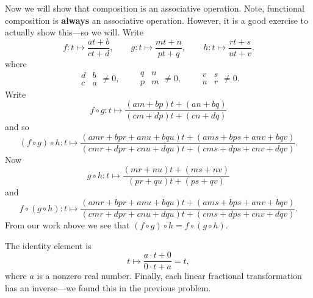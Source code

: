 \documentclass{ximera}
\begin{document}
\begin{exercise}
\begin{solution}
{Now we will show that composition is an associative operation. Note,
functional composition is \textbf{always} an associative
operation. However, it is a good exercise to actually show this---so
we will. Write
\[
f:t \mapsto\frac{at+b}{ct+d},\qquad
g:t \mapsto\frac{mt+n}{pt+q},\qquad
h:t \mapsto\frac{rt+s}{ut+v}.
\]
where
\[
\begin{array}{|cc|}
d & b\\
c& a
\end{array} \ne 0,\qquad
\begin{array}{|cc|}
q & n\\
p& m
\end{array} \ne 0,\qquad
\begin{array}{|cc|}
v & s\\
u& r
\end{array} \ne 0.
\]
Write
\[
f\circ g : t \mapsto \frac{(am+bp)t+(an+bq)}{(cm+dp)t + (cn+dq)}
\]
and so
\[
(f\circ g) \circ h : t\mapsto \frac{(amr+bpr+anu+bqu)t+(ams+bps+anv+bqv)}{(cmr+dpr+cnu+dqu)t+(cms+dps+cnv+dqv)}. 
\]
Now
\[
g\circ h : t \mapsto \frac{(mr+nu)t+(ms+nv)}{(pr+qu)t + (ps+qv)}
\]
and
\[
f\circ (g \circ h) : t\mapsto \frac{(amr+bpr+anu+bqu)t+(ams+bps+anv+bqv)}{(cmr+dpr+cnu+dqu)t+(cms+dps+cnv+dqv)}. 
\]
From our work above we see that $(f\circ g)\circ h = f\circ(g\circ
 h)$.  

The identity element is
\[
t\mapsto \frac{a\cdot t + 0}{0\cdot t + a} = t,
\]
where $a$ is a nonzero real number.  Finally, each linear fractional
transformation has an inverse---we found this in the previous problem.
}
\end{solution}
\end{exercise}
\end{document}
